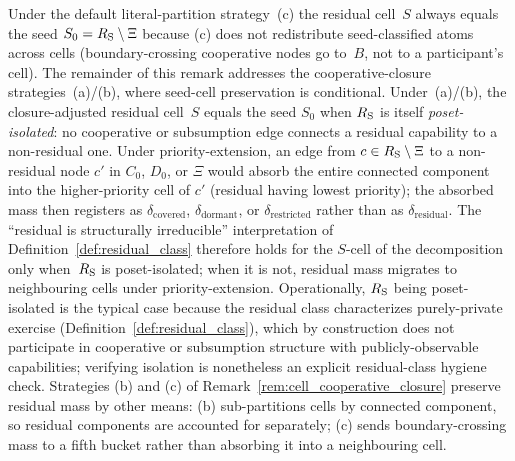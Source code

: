 \begin{remark}
\label{rem:residual_cell_irreducibility}
Under the default literal-partition strategy~(c) the residual
cell~$S$ always equals the seed $S_0 = R_{\mathrm{S}} \setminus \Xi$
because (c) does not redistribute seed-classified atoms
across cells (boundary-crossing cooperative nodes go to~$B$,
not to a participant's cell).  The remainder of this remark
addresses the cooperative-closure strategies~(a)/(b), where
seed-cell preservation is conditional.  Under~(a)/(b),
the closure-adjusted residual cell~$S$ equals the seed
$S_0$ when $R_{\mathrm{S}}$ is itself
\emph{poset-isolated}: no cooperative or subsumption edge
connects a residual capability to a non-residual one.  Under
priority-extension, an edge from $c \in
R_{\mathrm{S}} \setminus \Xi$ to a non-residual node $c'$ in $C_0$,
$D_0$, or $\Xi$ would absorb the entire connected component
into the higher-priority cell of $c'$ (residual having lowest
priority); the absorbed mass then registers as
$\delta_{\mathrm{covered}}$, $\delta_{\mathrm{dormant}}$, or
$\delta_{\mathrm{restricted}}$ rather than as
$\delta_{\mathrm{residual}}$.  The
``residual is structurally irreducible'' interpretation of
Definition~\ref{def:residual_class} therefore holds for the
$S$-cell of the decomposition only when~$R_{\mathrm{S}}$ is
poset-isolated; when it is not, residual mass migrates to
neighbouring cells under priority-extension.  Operationally,
$R_{\mathrm{S}}$ being poset-isolated is the typical case because the
residual class characterizes purely-private exercise
(Definition~\ref{def:residual_class}), which by construction
does not participate in cooperative or subsumption structure
with publicly-observable capabilities; verifying isolation is
nonetheless an explicit residual-class hygiene check.
Strategies (b) and (c) of
Remark~\ref{rem:cell_cooperative_closure} preserve residual
mass by other means: (b) sub-partitions cells by connected
component, so residual components are accounted for separately;
(c) sends boundary-crossing mass to a fifth bucket rather than
absorbing it into a neighbouring cell.
\end{remark}


